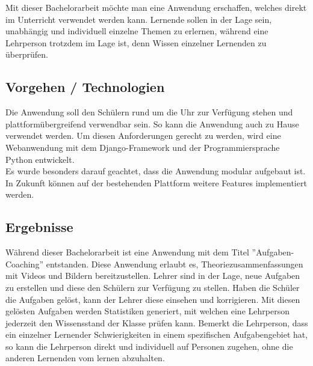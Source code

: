 Mit dieser Bachelorarbeit möchte man eine Anwendung erschaffen, welches direkt im Unterricht verwendet werden kann. Lernende sollen in der Lage sein, unabhängig und individuell einzelne Themen zu erlernen, während eine Lehrperson trotzdem im Lage ist, denn Wissen einzelner Lernenden zu überprüfen.



\subsection{Vorgehen / Technologien}
Die Anwendung soll den Schülern rund um die Uhr zur Verfügung stehen und plattformübergreifend verwendbar sein. So kann die Anwendung auch zu Hause verwendet werden. Um diesen Anforderungen gerecht zu werden, wird eine Webanwendung mit dem Django-Framework und der Programmiersprache Python entwickelt. \\
Es wurde besonders darauf geachtet, dass die Anwendung modular aufgebaut ist. In Zukunft können auf der bestehenden Plattform weitere Features implementiert werden.

\subsection{Ergebnisse}
Während dieser Bachelorarbeit ist eine Anwendung mit dem Titel ''Aufgaben-Coaching'' entstanden. Diese Anwendung erlaubt es, Theoriezusammenfassungen mit Videos und Bildern bereitzustellen. Lehrer sind in der Lage, neue Aufgaben zu erstellen und diese den Schülern zur Verfügung zu stellen. Haben die Schüler die Aufgaben gelöst, kann der Lehrer diese einsehen und korrigieren. Mit diesen gelösten Aufgaben werden Statistiken generiert, mit welchen eine Lehrperson jederzeit den Wissensstand der Klasse prüfen kann. Bemerkt die Lehrperson, dass ein einzelner Lernender Schwierigkeiten in einem spezifischen Aufgabengebiet hat, so kann die Lehrperson direkt und individuell auf Personen zugehen, ohne die anderen Lernenden vom lernen abzuhalten.

